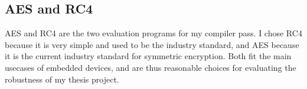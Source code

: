 \subsection{AES and RC4}
AES\cite{daemen2013design} and RC4\cite{rc4} are the two evaluation programs for my compiler pass.
I chose RC4 because it is very simple and used to be the industry standard, and AES because it is the current industry standard for symmetric encryption.
Both fit the main usecases of embedded devices, and are thus reasonable choices for evaluating the robustness of my thesis project.

